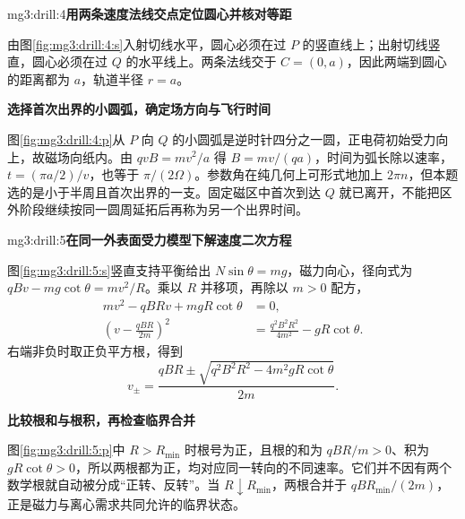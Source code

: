 \begin{drillsolution}{mg3:drill:4}\textbf{用两条速度法线交点定位圆心并核对等距}\par\nobreak
由图\ref{fig:mg3:drill:4:s}入射切线水平，圆心必须在过 $P$ 的竖直线上；出射切线竖直，圆心必须在过 $Q$ 的水平线上。两条法线交于 $C=(0,a)$，因此两端到圆心的距离都为 $a$，轨道半径 $r=a$。



\par\medskip{}\noindent\textbf{选择首次出界的小圆弧，确定场方向与飞行时间}\par\nobreak
图\ref{fig:mg3:drill:4:p}从 $P$ 向 $Q$ 的小圆弧是逆时针四分之一圆，正电荷初始受力向上，故磁场向纸内。由 $qvB=mv^2/a$ 得 $B=mv/(qa)$，时间为弧长除以速率，$t=(\pi a/2)/v$，也等于 $\pi/(2\Omega)$。参数角在纯几何上可形式地加上 $2\pi n$，但本题选的是小于半周且首次出界的一支。固定磁区中首次到达 $Q$ 就已离开，不能把区外阶段继续按同一圆周延拓后再称为另一个出界时间。\end{drillsolution}
\begin{drillsolution}{mg3:drill:5}\textbf{在同一外表面受力模型下解速度二次方程}\par\nobreak
图\ref{fig:mg3:drill:5:s}竖直支持平衡给出 $N\sin\theta=mg$，磁力向心，径向式为 $qBv-mg\cot\theta=mv^2/R$。乘以 $R$ 并移项，再除以 $m>0$ 配方，
\[
 \begin{aligned}
 mv^2-qBRv+mgR\cot\theta&=0,\\
 \left(v-\frac{qBR}{2m}\right)^2
 &=\frac{q^2B^2R^2}{4m^2}-gR\cot\theta.
 \end{aligned}
\]
右端非负时取正负平方根，得到
\[
v_\pm=\frac{qBR\pm\sqrt{q^2B^2R^2-4m^2gR\cot\theta}}{2m}.
\]



\par\medskip{}\noindent\textbf{比较根和与根积，再检查临界合并}\par\nobreak
图\ref{fig:mg3:drill:5:p}中 $R>R_{\min}$ 时根号为正，且根的和为 $qBR/m>0$、积为 $gR\cot\theta>0$，所以两根都为正，均对应同一转向的不同速率。它们并不因有两个数学根就自动被分成“正转、反转”。当 $R\downarrow R_{\min}$，两根合并于 $qBR_{\min}/(2m)$，正是磁力与离心需求共同允许的临界状态。\end{drillsolution}
